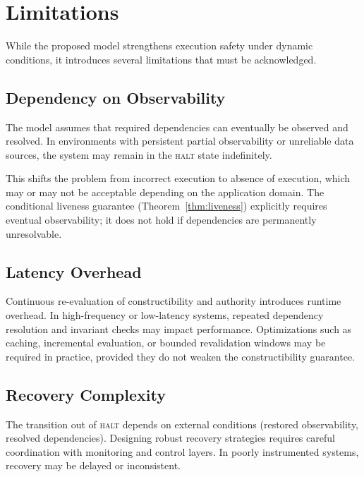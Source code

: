 \documentclass[11pt]{article}
\begin{document}
\section{Limitations}

While the proposed model strengthens execution safety under dynamic conditions, it
introduces several limitations that must be acknowledged.

\subsection{Dependency on Observability}

The model assumes that required dependencies can eventually be observed and resolved.
In environments with persistent partial observability or unreliable data sources, the
system may remain in the \textsc{halt} state indefinitely.

This shifts the problem from incorrect execution to absence of execution, which may or
may not be acceptable depending on the application domain. The conditional liveness
guarantee (Theorem~\ref{thm:liveness}) explicitly requires eventual observability; it
does not hold if dependencies are permanently unresolvable.

\subsection{Latency Overhead}

Continuous re-evaluation of constructibility and authority introduces runtime overhead.
In high-frequency or low-latency systems, repeated dependency resolution and invariant
checks may impact performance. Optimizations such as caching, incremental evaluation, or
bounded revalidation windows may be required in practice, provided they do not weaken
the constructibility guarantee.

\subsection{Recovery Complexity}

The transition out of \textsc{halt} depends on external conditions (restored
observability, resolved dependencies). Designing robust recovery strategies requires
careful coordination with monitoring and control layers. In poorly instrumented systems,
recovery may be delayed or inconsistent.
\end{document}

